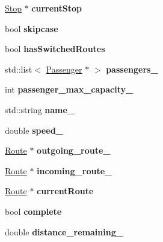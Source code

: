 \begin{DoxyCompactItemize}
\item 
\mbox{\label{classBus_a71d4efb1f0e2810c712d2b04eaa9f909}} 
\hyperlink{classStop}{Stop} $\ast$ {\bfseries current\+Stop}
\item 
\mbox{\label{classBus_aca3e8ae5c42858f0f9e59c53270ee04e}} 
bool {\bfseries skipcase}
\item 
\mbox{\label{classBus_a1e9e0ddf70d42b3320669f275a586587}} 
bool {\bfseries has\+Switched\+Routes}
\item 
\mbox{\label{classBus_a4a6e51d12fa70cbf9e973e82090773f3}} 
std\+::list$<$ \hyperlink{classPassenger}{Passenger} $\ast$ $>$ {\bfseries passengers\+\_\+}
\item 
\mbox{\label{classBus_a0f8a0586923d96c085a6d33b74150962}} 
int {\bfseries passenger\+\_\+max\+\_\+capacity\+\_\+}
\item 
\mbox{\label{classBus_a414fa2321dd325141c60741eb838972d}} 
std\+::string {\bfseries name\+\_\+}
\item 
\mbox{\label{classBus_acae5a7639b0c5b3c4a1d1f888ac18ce1}} 
double {\bfseries speed\+\_\+}
\item 
\mbox{\label{classBus_a625684b3e464f90f822f6303d6113b49}} 
\hyperlink{classRoute}{Route} $\ast$ {\bfseries outgoing\+\_\+route\+\_\+}
\item 
\mbox{\label{classBus_a393eb8015c87cc306a4ce18bf3f19956}} 
\hyperlink{classRoute}{Route} $\ast$ {\bfseries incoming\+\_\+route\+\_\+}
\item 
\mbox{\label{classBus_a0a220de5b56257d6835ae58a95f2c352}} 
\hyperlink{classRoute}{Route} $\ast$ {\bfseries current\+Route}
\item 
\mbox{\label{classBus_ae8b6cf1028a4f5dffd82c1423f17e58e}} 
bool {\bfseries complete}
\item 
\mbox{\label{classBus_ae0e153e41426834bb6c15ffa90bca417}} 
double {\bfseries distance\+\_\+remaining\+\_\+}
\end{DoxyCompactItemize}


